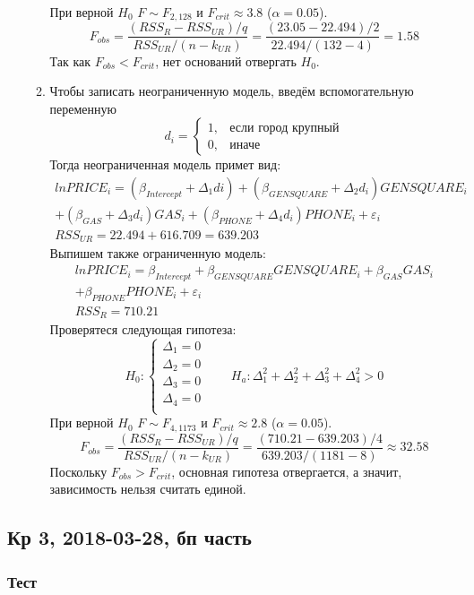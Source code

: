 \begin{enumerate}
\begin{enumerate}
При верной $H_0$ $F \sim F_{2, 128}$ и $F_{crit} \approx 3.8$ ($\alpha = 0.05$).
\[
F_{obs} = \frac{(RSS_R - RSS_{UR}) / q}{RSS_{UR}/(n - k_{UR})} = \frac{(23.05 - 22.494) / 2}{22.494 / (132 - 4)} = 1.58
\]
Так как $F_{obs} < F_{crit}$, нет оснований отвергать $H_0$.
\item Чтобы записать неограниченную модель, введём вспомогательную переменную
\[
d_i = \begin{cases}
1, & \text{если город крупный} \\
0, & \text{иначе}
\end{cases}
\]
Тогда неограниченная модель примет вид:
\begin{multline*}
lnPRICE_i = (\beta_{Intercept} + \Delta_1 di) + (\beta_{GENSQUARE} + \Delta_2 d_i) GENSQUARE_i \\
+ (\beta_{GAS} + \Delta_3 d_i) GAS_i + (\beta_{PHONE} + \Delta_4 d_i) PHONE_i + \varepsilon_i \\
RSS_{UR} = 22.494 + 616.709 = 639.203
\end{multline*}
Выпишем также ограниченную модель:
\begin{multline*}
lnPRICE_i = \beta_{Intercept} + \beta_{GENSQUARE} GENSQUARE_i + \beta_{GAS} GAS_i \\
+ \beta_{PHONE} PHONE_i + \varepsilon_i \\
RSS_{R} = 710.21
\end{multline*}
Проверятеся следующая гипотеза:
\[H_0:
\begin{cases}
  \Delta_1 = 0 \\
  \Delta_2 = 0 \\
  \Delta_3 = 0 \\
  \Delta_4 = 0 \\
\end{cases}
\qquad
H_a: \Delta_1^2 + \Delta_2^2 + \Delta_3^2+ \Delta_4^2 > 0
\]
При верной $H_0$ $F \sim F_{4, 1173}$ и $F_{crit} \approx 2.8$ ($\alpha = 0.05$).
\[
F_{obs} = \frac{(RSS_R - RSS_{UR}) / q}{RSS_{UR}/(n - k_{UR})} = \frac{(710.21 - 639.203)/4}{639.203/(1181-8)} \approx 32.58
\]
Поскольку $F_{obs} > F_{crit}$, основная гипотеза отвергается,
а значит, зависимость нельзя считать единой.
\end{enumerate}
\end{enumerate}

\subsection{Кр 3, 2018-03-28, бп часть}

\subsubsection{Тест}


